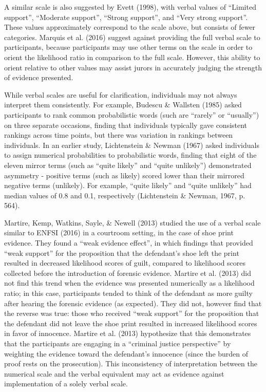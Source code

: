 \documentclass[print]{nuthesis}
\begin{document}
A similar scale is also suggested by Evett (1998), with verbal values of ``Limited support'', ``Moderate support'', ``Strong support'', and ``Very strong support''.
These values approximately correspond to the scale above, but consists of fewer categories.
Marquis et al. (2016) suggest against providing the full verbal scale to participants, because participants may use other terms on the scale in order to orient the likelihood ratio in comparison to the full scale.
However, this ability to orient relative to other values may assist jurors in accurately judging the strength of evidence presented.

While verbal scales are useful for clarification, individuals may not always interpret them consistently.
For example, Budescu \& Wallsten (1985) asked participants to rank common probabilistic words (such are ``rarely'' or ``usually'') on three separate occasions, finding that individuals typically gave consistent rankings across time points, but there was variation in rankings between individuals.
In an earlier study, Lichtenstein \& Newman (1967) asked individuals to assign numerical probabilities to probabilistic words, finding that eight of the eleven mirror terms (such as ``quite likely'' and ``quite unlikely'') demonstrated asymmetry - positive terms (such as likely) scored lower than their mirrored negative terms (unlikely). For example, ``quite likely'' and ``quite unlikely'' had median values of 0.8 and 0.1, respectively (Lichtenstein \& Newman, 1967, p. 564).

Martire, Kemp, Watkins, Sayle, \& Newell (2013) studied the use of a verbal scale similar to ENFSI (2016) in a courtroom setting, in the case of shoe print evidence.
They found a ``weak evidence effect'', in which findings that provided ``weak support'' for the proposition that the defendant's shoe left the print resulted in decreased likelihood scores of guilt, compared to likelihood scores collected before the introduction of forensic evidence.
Martire et al. (2013) did not find this trend when the evidence was presented numerically as a likelihood ratio; in this case, participants tended to think of the defendant as more guilty after hearing the forensic evidence (as expected).
They did not, however find that the reverse was true: those who received ``weak support'' for the proposition that the defendant did not leave the shoe print resulted in increased likelihood scores in favor of innocence.
Martire et al. (2013) hypothesize that this demonstrates that the participants are engaging in a ``criminal justice perspective'' by weighting the evidence toward the defendant's innocence (since the burden of proof rests on the prosecution).
This inconsistency of interpretation between the numerical scale and the verbal equivalent may act as evidence against implementation of a solely verbal scale.
\end{document}
